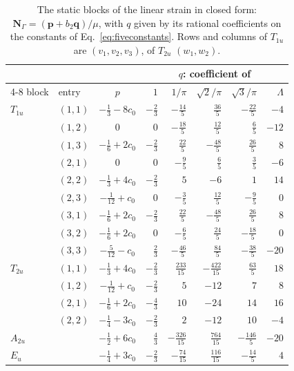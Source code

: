 \documentclass[11pt,a4paper]{article}
\begin{document}
\begin{table}[ht]
\centering\small
\setlength{\tabcolsep}{5pt}
\begin{tabular}{@{}llcrrrrr@{}}
\toprule
 & & & \multicolumn{5}{c}{$q$: coefficient of} \\
\cmidrule(lr){4-8}
block & entry & $p$ & $1$ & $1/\pi$ & $\sqrt2/\pi$ & $\sqrt3/\pi$ & $\Lambda$ \\
\midrule
$T_{1u}$ & $(1,1)$ & $-\tfrac13-8c_0$ & $-\tfrac23$ & $-\tfrac{14}{5}$ & $\tfrac{36}{5}$ & $-\tfrac{22}{5}$ & $-4$ \\
 & $(1,2)$ & $0$ & $0$ & $-\tfrac{18}{5}$ & $\tfrac{12}{5}$ & $\tfrac65$ & $-12$ \\
 & $(1,3)$ & $-\tfrac16+2c_0$ & $-\tfrac23$ & $\tfrac{22}{5}$ & $-\tfrac{48}{5}$ & $\tfrac{26}{5}$ & $8$ \\
 & $(2,1)$ & $0$ & $0$ & $-\tfrac95$ & $\tfrac65$ & $\tfrac35$ & $-6$ \\
 & $(2,2)$ & $-\tfrac13+4c_0$ & $-\tfrac23$ & $5$ & $-6$ & $1$ & $14$ \\
 & $(2,3)$ & $-\tfrac1{12}+c_0$ & $0$ & $-\tfrac35$ & $\tfrac{12}{5}$ & $-\tfrac95$ & $0$ \\
 & $(3,1)$ & $-\tfrac16+2c_0$ & $-\tfrac23$ & $\tfrac{22}{5}$ & $-\tfrac{48}{5}$ & $\tfrac{26}{5}$ & $8$ \\
 & $(3,2)$ & $-\tfrac16+2c_0$ & $0$ & $-\tfrac65$ & $\tfrac{24}{5}$ & $-\tfrac{18}{5}$ & $0$ \\
 & $(3,3)$ & $-\tfrac5{12}-c_0$ & $\tfrac23$ & $-\tfrac{46}{5}$ & $\tfrac{84}{5}$ & $-\tfrac{38}{5}$ & $-20$ \\
\midrule
$T_{2u}$ & $(1,1)$ & $-\tfrac13+4c_0$ & $-\tfrac23$ & $\tfrac{233}{15}$ & $-\tfrac{422}{15}$ & $\tfrac{63}{5}$ & $18$ \\
 & $(1,2)$ & $-\tfrac1{12}+c_0$ & $-\tfrac23$ & $5$ & $-12$ & $7$ & $8$ \\
 & $(2,1)$ & $-\tfrac16+2c_0$ & $-\tfrac43$ & $10$ & $-24$ & $14$ & $16$ \\
 & $(2,2)$ & $-\tfrac14-3c_0$ & $-\tfrac23$ & $2$ & $-12$ & $10$ & $-4$ \\
\midrule
$A_{2u}$ & & $-\tfrac12+6c_0$ & $\tfrac43$ & $-\tfrac{326}{15}$ & $\tfrac{764}{15}$ & $-\tfrac{146}{5}$ & $-20$ \\
$E_u$ & & $-\tfrac14+3c_0$ & $-\tfrac23$ & $-\tfrac{74}{15}$ & $\tfrac{116}{15}$ & $-\tfrac{14}{5}$ & $4$ \\
\bottomrule
\end{tabular}
\caption{The static blocks of the linear strain in closed form: $\mathbf{N}_\Gamma=(\mathbf{p}+b_2\mathbf{q})/\mu$,
with $q$ given by its rational coefficients on the constants of Eq.~\eqref{eq:fiveconstants}. Rows and
columns of $T_{1u}$ are $(v_1,v_2,v_3)$, of $T_{2u}$ $(w_1,w_2)$.}\label{tab:blocks}
\end{table}



\end{document}
